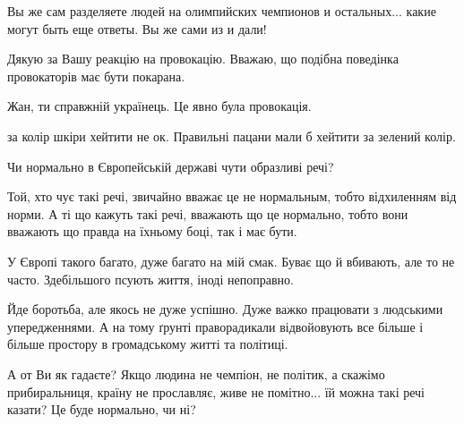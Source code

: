 \begin{itemize}
Вы же сам разделяете людей на олимпийских чемпионов и остальных... какие могут быть еще ответы. Вы же сами из и дали!


 
Дякую за Вашу реакцію на провокацію. Вважаю, що подібна поведінка провокаторів має бути покарана.

 
Жан, ти справжній українець. Це явно була провокація.

 
за колір шкіри хейтити не ок. Правильні пацани мали б хейтити за зелений колір.

 

Чи нормально в Європейській державі чути образливі речі?

Той, хто чує такі речі, звичайно вважає це не нормальным, тобто відхиленням від
норми. А ті що кажуть такі речі, вважають що це нормально, тобто вони вважають
що правда на їхньому боці, так і має бути.

У Європі такого багато, дуже багато на мій смак. Буває що й вбивають, але то не
часто. Здебільшого псують життя, іноді непоправно.

Йде боротьба, але якось не дуже успішно. Дуже важко працювати з людськими
упередженнями. А на тому ґрунті праворадикали відвойовують все більше і більше
простору в громадському житті та політиці.

А от Ви як гадаєте? Якщо людина не чемпіон, не політик, а скажімо
прибиральниця, країну не прославляє, живе не помітно... їй можна такі речі
казати? Це буде нормально, чи ні?


\end{itemize}
